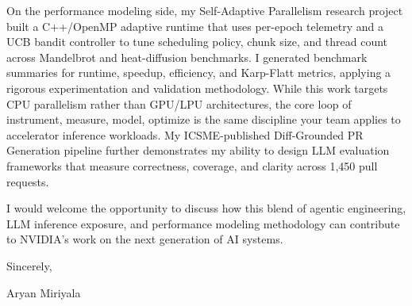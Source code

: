 \documentclass[letterpaper,11pt]{article}
\begin{document}
On the performance modeling side, my Self-Adaptive Parallelism research project built a C++/OpenMP adaptive runtime that uses per-epoch telemetry and a UCB bandit controller to tune scheduling policy, chunk size, and thread count across Mandelbrot and heat-diffusion benchmarks. I generated benchmark summaries for runtime, speedup, efficiency, and Karp-Flatt metrics, applying a rigorous experimentation and validation methodology. While this work targets CPU parallelism rather than GPU/LPU architectures, the core loop of instrument, measure, model, optimize is the same discipline your team applies to accelerator inference workloads. My ICSME-published Diff-Grounded PR Generation pipeline further demonstrates my ability to design LLM evaluation frameworks that measure correctness, coverage, and clarity across 1,450 pull requests.

I would welcome the opportunity to discuss how this blend of agentic engineering, LLM inference exposure, and performance modeling methodology can contribute to NVIDIA's work on the next generation of AI systems.

\vspace{12pt}

Sincerely,

\vspace{6pt}

Aryan Miriyala
\end{document}
